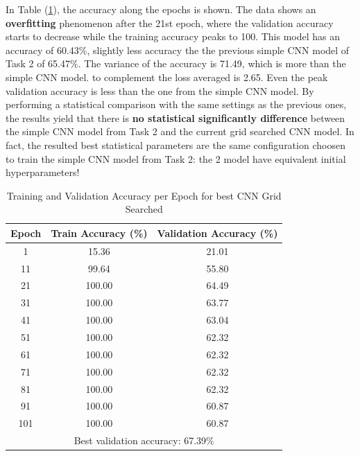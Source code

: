 \documentclass[11pt]{scrartcl}
\begin{document}
In Table (\ref{tab:task2-bonus-accuracy}), the accuracy along the epochs is shown.
The data shows an \textbf{overfitting} phenomenon after the 21st epoch,
where the validation accuracy starts to decrease while the training accuracy peaks to 100.
This model has an accuracy of 60.43\%, 
slightly less accuracy the the previous simple CNN model of Task 2 of 65.47\%.
The variance of the accuracy is 71.49, 
which is more than the simple CNN model.
to complement the loss averaged is 2.65.
Even the peak validation accuracy is less than the one from the simple CNN model.
By performing a statistical comparison with the same settings as the previous ones,
the results yield that there is \textbf{no statistical significantly difference}
between the simple CNN model from Task 2 and the current grid searched CNN model.
In fact, the resulted best statistical parameters are the same configuration choosen 
to train the simple CNN model from Task 2:
the 2 model have equivalent initial hyperparameters!

\begin{table}[htbp]
\centering
\caption{Training and Validation Accuracy per Epoch for best CNN Grid Searched}
\begin{tabular}{ccc}
\toprule
\textbf{Epoch} & \textbf{Train Accuracy (\%)} & \textbf{Validation Accuracy (\%)} \\
\midrule
1    & 15.36  & 21.01  \\
11   & 99.64  & 55.80  \\
21   & 100.00 & 64.49  \\
31   & 100.00 & 63.77  \\
41   & 100.00 & 63.04  \\
51   & 100.00 & 62.32  \\
61   & 100.00 & 62.32  \\
71   & 100.00 & 62.32  \\
81   & 100.00 & 62.32  \\
91   & 100.00 & 60.87  \\
101  & 100.00 & 60.87  \\
\midrule
\multicolumn{3}{c}{Best validation accuracy: 67.39\%} \\
\bottomrule
\end{tabular}
\label{tab:task2-bonus-accuracy}
\end{table}


\clearpage
\end{document}
